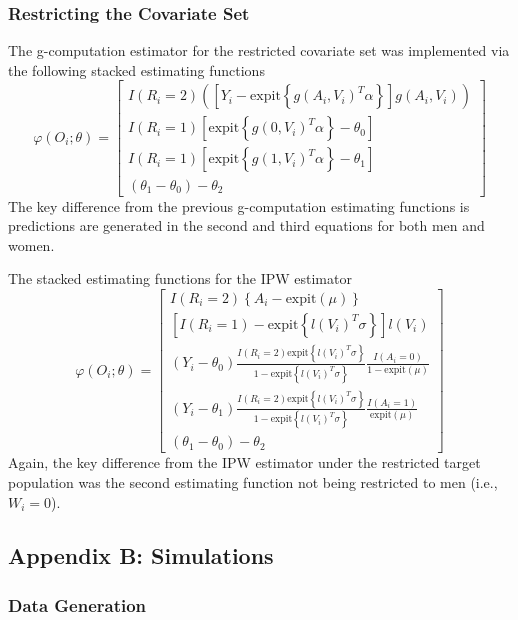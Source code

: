 \documentclass[]{article}
\begin{document}
\subsubsection*{Restricting the Covariate Set}

The g-computation estimator for the restricted covariate set was implemented via the following stacked estimating functions
\[\varphi(O_i; \theta) = 
\begin{bmatrix}
	I(R_i = 2) \left(\left[ Y_i - \text{expit}\left\{g(A_i,V_i)^T \alpha \right\} \right] g(A_i, V_i)\right)\\
	I(R_i = 1) \left[\text{expit}\left\{g(0,V_i)^T \alpha\right\} - \theta_0\right] \\
	I(R_i = 1) \left[\text{expit}\left\{g(1,V_i)^T \alpha\right\} - \theta_1\right] \\
	(\theta_1 - \theta_0) - \theta_2
\end{bmatrix}\]
The key difference from the previous g-computation estimating functions is predictions are generated in the second and third equations for both men and women.

The stacked estimating functions for the IPW estimator 
\[\varphi(O_i; \theta) = 
\begin{bmatrix}
	I(R_i=2) \left\{A_i - \text{expit}(\mu)\right\} \\
	\left[I(R_i = 1) - \text{expit}\left\{l(V_i)^T \sigma\right\}\right] l(V_i) \\
	(Y_i - \theta_0) \frac{I(R_i = 2) \text{expit}\left\{l(V_i)^T \sigma \right\} }{1 - \text{expit}\left\{l(V_i)^T \sigma \right\}} \frac{I(A_i = 0)}{1 - \text{expit}(\mu)} \\
	(Y_i - \theta_1) \frac{I(R_i = 2) \text{expit}\left\{l(V_i)^T \sigma \right\} }{1 - \text{expit}\left\{l(V_i)^T \sigma \right\}} \frac{I(A_i = 1)}{\text{expit}(\mu)} \\
	(\theta_1 - \theta_0) - \theta_2
\end{bmatrix}\]
Again, the key difference from the IPW estimator under the restricted target population was the second estimating function not being restricted to men (i.e., $W_i = 0$).

\subsection*{Appendix B: Simulations}

\subsubsection*{Data Generation}
\end{document}
